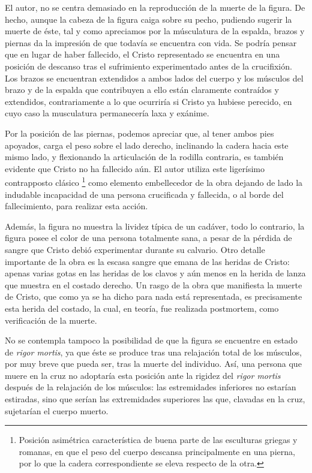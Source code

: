 El autor, no se centra demasiado en la reproducción de la muerte de la figura. De hecho, aunque la cabeza de la figura caiga sobre su pecho, pudiendo sugerir la muerte de éste, tal y como apreciamos por la músculatura de la espalda, brazos y piernas da la impresión de que todavía se encuentra con vida. Se podría pensar que en lugar de haber fallecido, el Cristo representado se encuentra en una posición de descanso tras el sufrimiento experimentado antes de la crucifixión. Los brazos se encuentran extendidos a ambos lados del cuerpo y los músculos del brazo y de la espalda que contribuyen a ello están claramente contraídos y extendidos, contrariamente a lo que ocurriría si Cristo ya hubiese perecido, en cuyo caso la musculatura permanecería laxa y exánime.

Por la posición de las piernas, podemos apreciar que, al tener ambos pies apoyados, carga el peso sobre el lado derecho, inclinando la cadera hacia este mismo lado, y flexionando la articulación de la rodilla contraria, es también evidente que Cristo no ha fallecido aún. El autor utiliza este ligerísimo contrapposto clásico \footnote{Posición asimétrica característica de buena parte de las esculturas griegas y romanas, en que el peso del cuerpo descansa principalmente en una pierna, por lo que la cadera correspondiente se eleva respecto de la otra. %
} como elemento embellecedor de la obra dejando de lado la indudable incapacidad de una persona crucificada y fallecida, o al borde del fallecimiento, para realizar esta acción.

Además, la figura no muestra la lividez típica de un cadáver, todo lo contrario, la figura posee el color de una persona totalmente sana, a pesar de la pérdida de sangre que Cristo debió experimentar durante su calvario. Otro detalle importante de la obra es la escasa sangre que emana de las heridas de Cristo: apenas varias gotas en las heridas de los clavos y aún menos en la herida de lanza que muestra en el costado derecho. Un rasgo de la obra que  manifiesta la muerte de Cristo, que como ya se ha dicho para nada está representada, es precisamente esta herida del costado, la cual, en teoría, fue realizada postmortem, como verificación de la muerte.

No se contempla tampoco la posibilidad de que la figura se encuentre en estado de \textit{rigor mortis}, ya que éste se produce tras una relajación total de los músculos, por muy breve que pueda ser, tras la muerte del individuo. Así, una persona que muere en la cruz no adoptaría esta posición ante la rigidez del \textit{rigor mortis} después de la relajación de los músculos: las estremidades inferiores no estarían estiradas, sino que serían las extremidades superiores las que, clavadas en la cruz, sujetarían el cuerpo muerto.

